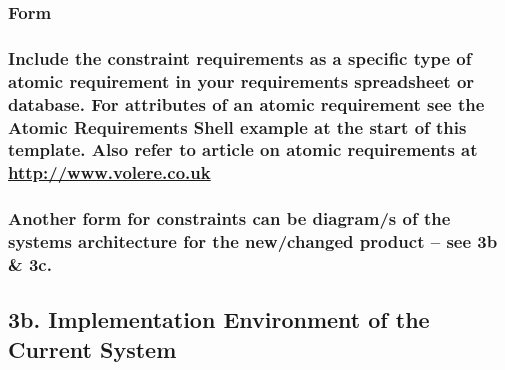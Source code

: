 \documentclass[
]{article}
\begin{document}
\hypertarget{form-10}{%
\subsubsection{Form}\label{form-10}}

\hypertarget{include-the-constraint-requirements-as-a-specific-type-of-atomic-requirement-in-your-requirements-spreadsheet-or-database.-for-attributes-of-an-atomic-requirement-see-the-atomic-requirements-shell-example-at-the-start-of-this-template.-also-refer-to-article-on-atomic-requirements-at-httpwww.volere.co.uk}{%
\subsubsection{\texorpdfstring{Include the constraint requirements as a
specific type of atomic requirement in your requirements spreadsheet or
database. For attributes of an atomic requirement see the Atomic
Requirements Shell example at the start of this template. Also refer to
article on atomic requirements at
\href{http://www.volere.co.uk/}{http://www.volere.co.uk}}{Include the constraint requirements as a specific type of atomic requirement in your requirements spreadsheet or database. For attributes of an atomic requirement see the Atomic Requirements Shell example at the start of this template. Also refer to article on atomic requirements at http://www.volere.co.uk}}\label{include-the-constraint-requirements-as-a-specific-type-of-atomic-requirement-in-your-requirements-spreadsheet-or-database.-for-attributes-of-an-atomic-requirement-see-the-atomic-requirements-shell-example-at-the-start-of-this-template.-also-refer-to-article-on-atomic-requirements-at-httpwww.volere.co.uk}}

\hypertarget{another-form-for-constraints-can-be-diagrams-of-the-systems-architecture-for-the-newchanged-product-see-3b-3c.}{%
\subsubsection{Another form for constraints can be diagram/s of the
systems architecture for the new/changed product -- see 3b \&
3c.}\label{another-form-for-constraints-can-be-diagrams-of-the-systems-architecture-for-the-newchanged-product-see-3b-3c.}}

\hypertarget{b.-implementation-environment-of-the-current-system}{%
\subsection{3b. Implementation Environment of the Current
System}\label{b.-implementation-environment-of-the-current-system}}
\end{document}
